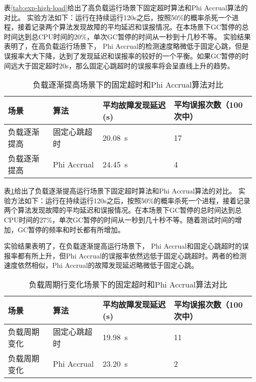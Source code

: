 表\ref{tab:exp-high-load}给出了高负载运行场景下固定超时算法和Phi Accrual算法的对比。
实验方法如下：运行在持续运行120s之后，按照50\%的概率杀死一个进程，接着记录两个算法发现故障的平均延迟和误报情况。在本场景下GC暂停的总时间达到总CPU时间的20\%，单次GC暂停的时间从一秒到十几秒不等。
实验结果表明了，在高负载运行场景下，
Phi Accrual的检测速度略微低于固定心跳，但是误报率大大下降，达到了发现延迟和误报率的较好的一个平衡。如果GC暂停的时间远大于固定超时20s，那么固定心跳超时的误报率将会呈直线上升的趋势。


\begin{table}[h!]
    \centering
    \caption{负载逐渐提高场景下的固定超时和Phi Accrual算法对比}
    \label{tab:exp-increase-load}
    \begin{tabular}{@{}llll@{}}
        \toprule
        场景 & 算法 & 平均故障发现延迟 (s) & 平均误报次数（100次中） \\
        \midrule
        负载逐渐提高 & 固定心跳超时 & \SI{20.08}{\second} & 17 \\
        负载逐渐提高 & Phi Accrual & \SI{24.45}{\second} & 4 \\
        \bottomrule
    \end{tabular}
\end{table}

表\ref{tab:exp-increase-load}给出了负载逐渐提高运行场景下固定超时算法和Phi Accrual算法的对比。
实验方法如下：运行在持续运行120s之后，按照50\%的概率杀死一个进程，接着记录两个算法发现故障的平均延迟和误报情况。在本场景下GC暂停的总时间达到总CPU时间的27\%，单次GC暂停的时间从一秒到几十秒不等。随着测试时间的增加，GC暂停的频率和时长都有所增加。

实验结果表明了，在负载逐渐提高运行场景下，
Phi Accrual和固定心跳超时的误报率都有所上升，但Phi Accrual的误报率依然远低于固定心跳超时。两者的检测速度依然相似，Phi Accrual的故障发现延迟略微低于固定心跳。


\begin{table}[h!]
    \centering
    \caption{负载周期行变化场景下的固定超时和Phi Accrual算法对比}
    \label{tab:exp-seasonal-load}
    \begin{tabular}{@{}llll@{}}
        \toprule
        场景 & 算法 & 平均故障发现延迟 (s) & 平均误报次数（100次中） \\
        \midrule
        负载周期变化 & 固定心跳超时 & \SI{19.98}{\second} & 11 \\
        负载周期变化 & Phi Accrual & \SI{23.20}{\second} & 2 \\
        \bottomrule
    \end{tabular}
\end{table}

